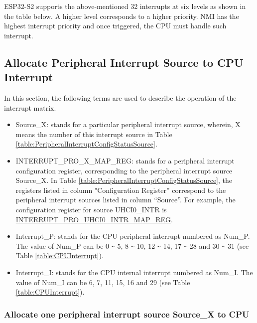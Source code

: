 \documentclass[main\_\_EN.tex]{subfiles}
\begin{document}
ESP32-S2 supports the above-mentioned 32 interrupts at six levels as shown in the table below. A higher level corresponds to a higher priority. NMI has the highest interrupt priority and once triggered, the CPU must handle such interrupt.




\subsection{Allocate Peripheral Interrupt Source to CPU Interrupt}

In this section, the following terms are used to describe the operation of the interrupt matrix.

\begin{itemize}

\item Source\_X: stands for a particular peripheral interrupt source, wherein, X means the number of this interrupt source in Table \ref{table:PeripheralInterruptConfigStatusSource}.

\item INTERRUPT\_PRO\_X\_MAP\_REG: stands for a peripheral interrupt configuration register, corresponding to the peripheral interrupt source Source\_X. In Table \ref{table:PeripheralInterruptConfigStatusSource}, the registers listed in column "Configuration Register” correspond to the peripheral interrupt sources listed in column “Source”. For example, the configuration register for source UHCI0\_INTR is \hyperref[regdesc:INTERRUPTPROUHCI0INTRMAPREG]{INTERRUPT\_PRO\_UHCI0\_INTR\_MAP\_REG}.

\item Interrupt\_P: stands for the CPU peripheral interrupt numbered as Num\_P. The value of Num\_P can be 0 \verb+~+ 5, 8 \verb+~+ 10, 12 \verb+~+ 14, 17 \verb+~+ 28 and 30 \verb+~+ 31 (see Table \ref{table:CPUInterrupt}).

\item Interrupt\_I: stands for the CPU internal interrupt numbered as Num\_I. The value of Num\_I can be 6, 7, 11, 15, 16 and 29 (see Table \ref{table:CPUInterrupt}).

\end{itemize}

\subsubsection{Allocate one peripheral interrupt source Source\_X to CPU}
\end{document}
